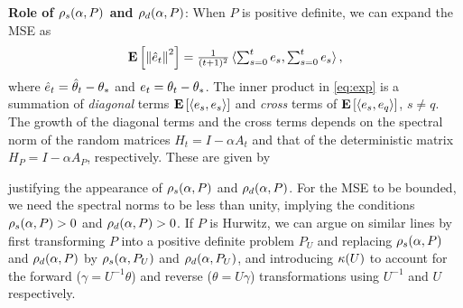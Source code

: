 \textbf{Role of $\rho_s(\alpha,P)$ and $\rho_d(\alpha,P)$}: 
When $P$ is positive definite, we can expand the MSE as 
\begin{align}
\label{eq:exp}
	\mathbf{E}\left[\left\| \hat{e}_t\right\|^2\right]=\tfrac{1}{(t+1)^2}\, \langle \textstyle\sum_{s=0}^t e_s,\textstyle\sum_{s=0}^t e_s\rangle\,,
\end{align} 
where $\hat{e}_t = \hat{\theta}_t-\theta_*$ and $e_t = \theta_t-\theta_*$.
The inner product in \eqref{eq:exp} is a summation of \emph{diagonal} terms $\mathbf{E}\left[\langle e_s,e_s\rangle\right]$ and \emph{cross} terms of $\mathbf{E}\left[\langle e_s,e_q\rangle\right]$, $s\neq q$. The growth of the diagonal terms and the cross terms depends on the spectral norm of the random matrices $H_t=I-\alpha A_t$ and that of the deterministic matrix $H_P=I-\alpha A_P$, respectively. These are given by
\begin{comment}
The output $\thh_t$ of the algorithm \eqref{eq:lsa} is the average of the internal states at times $s=0,\ldots,t-1$. The error dynamics of the internal states by looking at the behavior of $e_t\eqdef \theta_t-\ts$.
\begin{align}\label{eq:errec}
\theta_t&=\theta_{t-1}+\alpha(b_t-A_t\theta_{t-1})\nn\\
\theta_t-\ts&=\theta_{t-1}-\ts+\alpha\left(b_t-A_t(\theta_{t-1}-\ts+\ts)\right)\nn\\
e_t&=e_{t-1}+\alpha(b_t-A_t e_t -A_t\ts)\nn\\
e_t&=\underbrace{((I-\alpha A_t))}_{\text{Random-Matrix}} e_{t-1}+\underbrace{\alpha(N_t -(M_t)\ts)}_{\text{Noise}}
\end{align}
From \eqref{errec} it is clear that the error dynamics depends on the $i)$ properties of the random matrix, $ii)$ properties of the noise. In the absence of the noise term in \eqref{eq:errec}, we have $e_t=(I-\alpha A_t) e_{t-1}=\Pi_{s=1}(I-\alpha A_s) e_0$, i.e., the initial error is get multiplied by a product of random matrices. In such a scenario, we can guess that whether or not the algorithm forgets the bias $\norm{\theta_0-\ts}$, depends on whether the matrix product is contracting. One way to characterize this contracting property is to look at the spectral radius of the random matrix, which is given by $\EE{\norm{I-\alpha A_t}^2}=1-\alpha \rhos{P},  {\norm{I-\alpha A_P}^2}=1-\alpha \rhod{P}\,,$
\end{comment}
\begin{comment}
\begin{align}\label{eq:spectralrand}
\EE{\norm{I-\alpha A_t}^2}=1-\alpha \rhos{P}, \quad  {\norm{I-\alpha A_P}^2}=1-\alpha \rhod{P}\,,
\end{align}
\end{comment}
justifying the appearance of $\rho_s(\alpha,P)$ and $\rho_d(\alpha,P)$.
For the MSE to be bounded, we need the spectral norms to be less than unity, implying the conditions $\rho_s(\alpha,P)>0$ and $\rho_d(\alpha,P)>0$. If $P$ is Hurwitz, we can argue on similar lines by first transforming $P$ into a positive definite problem $P_U$ and replacing $\rho_s(\alpha,P)$ and $\rho_d(\alpha,P)$ by $\rho_s(\alpha,P_U)$ and $\rho_d(\alpha,P_U)$, and introducing $\kappa(U)$ to account for the forward ($\gamma=U^{-1}\theta$) and reverse ($\theta=U\gamma$) transformations using $U^{-1}$ and $U$ respectively.

